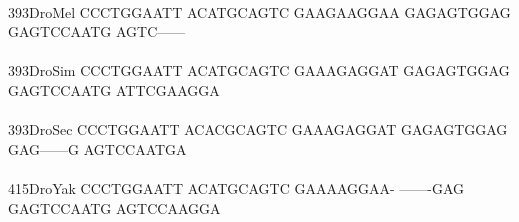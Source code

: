 \documentclass[11pt,twoside,reqno,a4paper]{article}
\begin{document}
{\\
393\hspace*{1\charwidth}DroMel	CCCTGGAATT	ACATGCAGTC	GAAGAAGGAA	GAGAGTGGAG	GAGTCCAATG	AGTC------	\\
\hspace*{4\charwidth}\hspace*{7\charwidth}\hspace*{1\charwidth}\hspace*{1\charwidth}\hspace*{1\charwidth}\hspace*{1\charwidth}\hspace*{1\charwidth}\hspace*{1\charwidth}\\
393\hspace*{1\charwidth}DroSim	CCCTGGAATT	ACATGCAGTC	GAAAGAGGAT	GAGAGTGGAG	GAGTCCAATG	ATTCGAAGGA	\\
\hspace*{4\charwidth}\hspace*{7\charwidth}\hspace*{1\charwidth}\hspace*{1\charwidth}\hspace*{1\charwidth}\hspace*{1\charwidth}\hspace*{1\charwidth}\hspace*{1\charwidth}\\
393\hspace*{1\charwidth}DroSec	CCCTGGAATT	ACACGCAGTC	GAAAGAGGAT	GAGAGTGGAG	GAG------G	AGTCCAATGA	\\
\hspace*{4\charwidth}\hspace*{7\charwidth}\hspace*{1\charwidth}\hspace*{1\charwidth}\hspace*{1\charwidth}\hspace*{1\charwidth}\hspace*{1\charwidth}\hspace*{1\charwidth}\\
415\hspace*{1\charwidth}DroYak	CCCTGGAATT	ACATGCAGTC	GAAAAGGAA-	-------GAG	GAGTCCAATG	AGTCCAAGGA	\\
\hspace*{4\charwidth}\hspace*{7\charwidth}\hspace*{1\charwidth}\hspace*{1\charwidth}\hspace*{1\charwidth}\hspace*{1\charwidth}\hspace*{1\charwidth}\hspace*{1\charwidth}\\
}
\end{document}
